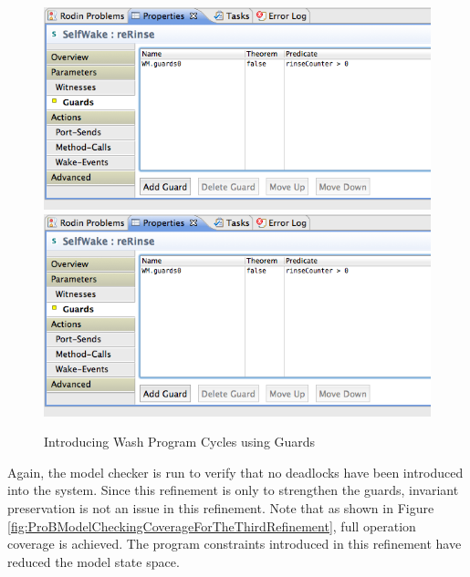  \begin{figure}[!htbp]
  \centering
  \ifplastex
  \includegraphics[width=1024]{figures/image38.png}
  \else
  \includegraphics[width=1\textwidth]{figures/image38.png}
  \fi
  \caption{Introducing Wash Program Cycles using Guards}
  \label{fig:IntroducingWashProgramCyclesUsingGuards}
\end{figure} 
 
Again, the model checker is run to verify that no deadlocks have been introduced into the system. Since this refinement is only to strengthen the guards, invariant preservation is not an issue in this refinement. Note that as shown in Figure \ref{fig:ProBModelCheckingCoverageForTheThirdRefinement}, full operation coverage is achieved. The program constraints introduced in this refinement have reduced the model state space. 
 
